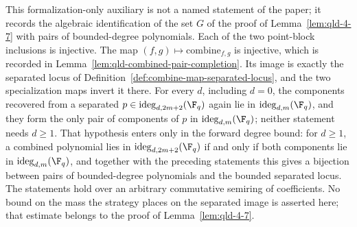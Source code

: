 \begin{lemma}
	\label{lem:combine-map-separated-image}
	\leanok
	This formalization-only auxiliary is not a named statement of the paper; it
	records the algebraic identification of the set $G$ of the proof of
	Lemma~\ref{lem:qld-4-7} with pairs of bounded-degree polynomials. Each of
	the two point-block inclusions is injective. The map
	$(f, g) \mapsto \mathrm{combine}_{f,g}$ is injective, which is recorded in
	Lemma~\ref{lem:qld-combined-pair-completion}. Its image is exactly
	the separated locus of
	Definition~\ref{def:combine-map-separated-locus}, and the two specialization
	maps invert it there. For every $d$, including $d = 0$, the components
	recovered from a separated $p \in \mathrm{ideg}_{d,2m+2}(\F_q)$ again lie in
	$\mathrm{ideg}_{d,m}(\F_q)$, and they form the only pair of components of
	$p$ in $\mathrm{ideg}_{d,m}(\F_q)$; neither statement needs $d \ge 1$. That
	hypothesis enters only in the forward degree bound: for $d \ge 1$, a
	combined polynomial lies in $\mathrm{ideg}_{d,2m+2}(\F_q)$ if and only if
	both components lie in $\mathrm{ideg}_{d,m}(\F_q)$, and together with the
	preceding statements this gives a bijection between pairs of
	bounded-degree polynomials and the bounded separated locus. The
	statements hold over an arbitrary commutative semiring of coefficients. No
	bound on the mass the strategy places on the separated image is asserted
	here; that estimate belongs to the proof of Lemma~\ref{lem:qld-4-7}.
\end{lemma}
